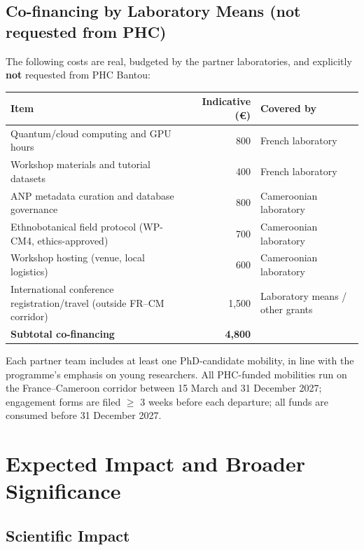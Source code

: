 \documentclass[11pt,a4paper]{article}
\begin{document}
\subsection{Co-financing by Laboratory Means (not requested from PHC)}

The following costs are real, budgeted by the partner laboratories, and explicitly \textbf{not} requested from PHC Bantou:

\begin{table}[htbp]
\centering
\small
\begin{tabular}{lrl}
\toprule
\textbf{Item} & \textbf{Indicative (€)} & \textbf{Covered by} \\
\midrule
Quantum/cloud computing and GPU hours & 800 & French laboratory \\
Workshop materials and tutorial datasets & 400 & French laboratory \\
ANP metadata curation and database governance & 800 & Cameroonian laboratory \\
Ethnobotanical field protocol (WP-CM4, ethics-approved) & 700 & Cameroonian laboratory \\
Workshop hosting (venue, local logistics) & 600 & Cameroonian laboratory \\
International conference registration/travel (outside FR--CM corridor) & 1,500 & Laboratory means / other grants \\
\midrule
\textbf{Subtotal co-financing} & \textbf{4,800} & \\
\bottomrule
\end{tabular}
\end{table}

Each partner team includes at least one PhD-candidate mobility, in line with the programme's emphasis on young researchers. All PHC-funded mobilities run on the France--Cameroon corridor between 15 March and 31 December 2027; engagement forms are filed $\geq$ 3 weeks before each departure; all funds are consumed before 31 December 2027.

\section{Expected Impact and Broader Significance}

\subsection{Scientific Impact}
\end{document}
